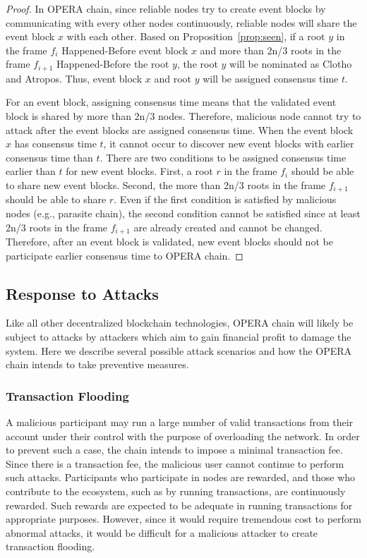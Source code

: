 \documentclass[preprint,12pt]{elsarticle}
\begin{document}
\begin{proof}
In OPERA chain, since reliable nodes try to create event blocks by communicating with every other nodes continuously, reliable nodes will share the event block $x$ with each other. Based on Proposition~\ref{prop:seen}, if a root $y$ in the frame $f_{i}$ Happened-Before event block $x$ and more than 2n/3 roots in the frame $f_{i+1}$ Happened-Before the root $y$, the root $y$ will be nominated as Clotho and Atropos. Thus, event block $x$ and root $y$ will be assigned consensus time $t$. 

For an event block, assigning consensus time means that the validated event block is shared by more than 2n/3 nodes. Therefore, malicious node cannot try to attack after the event blocks are assigned consensus time. When the event block $x$ has consensus time $t$, it cannot occur to discover new event blocks with earlier consensus time than $t$.
There are two conditions to be assigned consensus time earlier than $t$ for new event blocks. First, a root $r$ in the frame $f_{i}$ should be able to share new event blocks. Second, the more than 2n/3 roots in the frame $f_{i+1}$ should be able to share $r$. Even if the first condition is satisfied by malicious nodes (e.g., parasite chain),
the second condition cannot be satisfied since at least 2n/3 roots in the frame $f_{i+1}$ are already created and cannot be changed. Therefore, after an event block is validated, new event blocks should not be participate earlier consensus time to OPERA chain. 
\end{proof}

\subsection{Response to Attacks}\label{se:ra}
Like all other decentralized blockchain technologies, OPERA chain will likely be subject to attacks by attackers which aim to gain financial profit to damage the system. Here we describe several possible attack scenarios and how the OPERA chain intends to take preventive measures.

\subsubsection{Transaction Flooding}
A malicious participant may run a large number of valid transactions from their account under their control with the purpose of overloading the network. In order to prevent such a case, the chain intends to impose a minimal transaction fee. Since there is a transaction fee, the malicious user cannot continue to perform such attacks. Participants who participate in nodes are rewarded, and those who contribute to the ecosystem, such as by running transactions, are continuously rewarded. Such rewards are expected to be adequate in running transactions for appropriate purposes. However, since it would require tremendous cost to perform abnormal attacks, it would be difficult for a malicious attacker to create transaction flooding.
\end{document}
